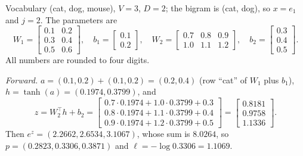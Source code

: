 \begin{notechapter}
\begin{example}\label{bigram-neural:ex:step}
Vocabulary (cat, dog, mouse), $V = 3$, $D = 2$; the bigram is (cat, dog), so $x = e_1$ and $j = 2$. The parameters are
\[
  W_1 = \begin{bmatrix}0.1 & 0.2\\ 0.3 & 0.4\\ 0.5 & 0.6\end{bmatrix},\quad b_1 = \begin{bmatrix}0.1\\ 0.2\end{bmatrix},\quad
  W_2 = \begin{bmatrix}0.7 & 0.8 & 0.9\\ 1.0 & 1.1 & 1.2\end{bmatrix},\quad b_2 = \begin{bmatrix}0.3\\ 0.4\\ 0.5\end{bmatrix}.
\]
All numbers are rounded to four digits.

\emph{Forward.} $a = (0.1, 0.2) + (0.1, 0.2) = (0.2, 0.4)$ (row ``cat'' of $W_1$ plus $b_1$), $h = \tanh(a) = (0.1974, 0.3799)$, and
\[
  z = W_2^\top h + b_2 = \begin{bmatrix}0.7\cdot0.1974 + 1.0\cdot0.3799 + 0.3\\ 0.8\cdot0.1974 + 1.1\cdot0.3799 + 0.4\\ 0.9\cdot0.1974 + 1.2\cdot0.3799 + 0.5\end{bmatrix}
  = \begin{bmatrix}0.8181\\ 0.9758\\ 1.1336\end{bmatrix} .
\]
Then $e^z = (2.2662, 2.6534, 3.1067)$, whose sum is $8.0264$, so $p = (0.2823, 0.3306, 0.3871)$ and $\ell = -\log0.3306 = 1.1069$.


\end{example}
\end{notechapter}
